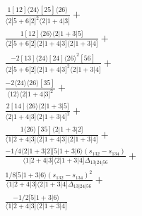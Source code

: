 \documentclass[varwidth, border=5pt]{standalone}
\begin{document}
\begin{my}
$\begin{gathered}
\scriptscriptstyle\frac{1[12]⟨24⟩[25]⟨26⟩}{⟨2|5+6|2]^2⟨2|1+4|3]}+\\
\scriptscriptstyle\frac{1[12]⟨26⟩⟨2|1+3|5]}{⟨2|5+6|2]⟨2|1+4|3]⟨2|1+3|4]}+\\
\scriptscriptstyle\frac{-2[13]⟨24⟩[24]⟨26⟩^2[56]}{⟨2|5+6|2]⟨2|1+4|3]^2⟨2|1+3|4]}+\\
\scriptscriptstyle\frac{-2⟨24⟩⟨26⟩[35]}{⟨12⟩⟨2|1+4|3]^2}+\\
\scriptscriptstyle\frac{2[14]⟨26⟩⟨2|1+3|5]}{⟨2|1+4|3]⟨2|1+3|4]^2}+\\
\scriptscriptstyle\frac{1⟨26⟩[35]⟨2|1+3|2]}{⟨1|2+4|3]⟨2|1+4|3]⟨2|1+3|4]}+\\
\scriptscriptstyle\frac{-1/4⟨2|1+3|2][5|1+3|6⟩(s_{132}-s_{134})}{⟨1|2+4|3]⟨2|1+3|4]Δ_{13|24|56}}+\\
\scriptscriptstyle\frac{1/8[5|1+3|6⟩(s_{132}-s_{134})^2}{⟨1|2+4|3]⟨2|1+3|4]Δ_{13|24|56}}+\\
\scriptscriptstyle\frac{-1/2[5|1+3|6⟩}{⟨1|2+4|3]⟨2|1+3|4]}\phantom{+}
\end{gathered}$
\end{my}
\end{document}
